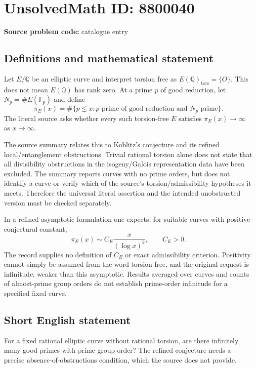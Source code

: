 \documentclass[11pt]{article}
\newcommand{\Q}{\mathbb{Q}}
\newcommand{\F}{\mathbb{F}}
\begin{document}
\section*{UnsolvedMath ID: 8800040}
\textbf{Source problem code:} catalogue entry
\subsection{Definitions and mathematical statement}
Let $E/\Q$ be an elliptic curve and interpret torsion free as $E(\Q)_{\mathrm{tors}}=\{O\}$. This does not mean $E(\Q)$ has rank zero. At a prime $p$ of good reduction, let $N_p=\#E(\F_p)$ and define
\[
\pi_E(x)=\#\{p\leq x:p\text{ prime of good reduction and }N_p\text{ prime}\}.
\]
The literal source asks whether every such torsion-free $E$ satisfies $\pi_E(x)\to\infty$ as $x\to\infty$.

The source summary relates this to Koblitz's conjecture and its refined local/entanglement obstructions. Trivial rational torsion alone does not state that all divisibility obstructions in the isogeny/Galois representation data have been excluded. The summary reports curves with no prime orders, but does not identify a curve or verify which of the source's torsion/admissibility hypotheses it meets. Therefore the universal literal assertion and the intended unobstructed version must be checked separately.

In a refined asymptotic formulation one expects, for suitable curves with positive conjectural constant,
\[
\pi_E(x)\sim C_E\frac{x}{(\log x)^2},\qquad C_E>0.
\]
The record supplies no definition of $C_E$ or exact admissibility criterion. Positivity cannot simply be assumed from the word torsion-free, and the original request is infinitude, weaker than this asymptotic. Results averaged over curves and counts of almost-prime group orders do not establish prime-order infinitude for a specified fixed curve.
\subsection{Short English statement}
For a fixed rational elliptic curve without rational torsion, are there infinitely many good primes with prime group order? The refined conjecture needs a precise absence-of-obstructions condition, which the source does not provide.
\end{document}

